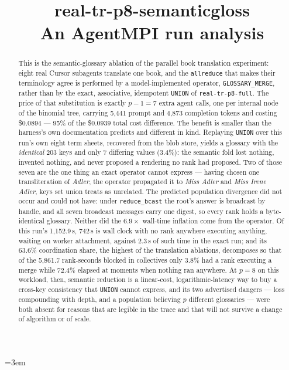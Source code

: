 \documentclass[11pt]{article}
\title{\textbf{real-tr-p8-semanticgloss}\\[2pt]\large An AgentMPI run analysis}
\author{}
\date{}
\begin{document}
\emergencystretch=3em
\maketitle

\begin{abstract}
This is the semantic-glossary ablation of the parallel book translation experiment: eight real
Cursor subagents translate one book, and the \texttt{allreduce} that makes their terminology
agree is performed by a model-implemented operator, \texttt{GLOSSARY\_MERGE}, rather than by the
exact, associative, idempotent \texttt{UNION} of \texttt{real-tr-p8-full}. The price of that
substitution is exactly $p-1=7$ extra agent calls, one per internal node of the binomial tree,
carrying 5{,}441 prompt and 4{,}873 completion tokens and costing \$0.0894 --- 95\% of the
\$0.0939 total cost difference. The benefit is smaller than the harness's own documentation
predicts and different in kind. Replaying \texttt{UNION} over this run's own eight term sheets,
recovered from the blob store, yields a glossary with the \emph{identical} 203 keys and only 7
differing values (3.4\%): the semantic fold lost nothing, invented nothing, and never proposed a
rendering no rank had proposed. Two of those seven are the one thing an exact operator cannot
express --- having chosen one transliteration of \emph{Adler}, the operator propagated it to
\emph{Miss Adler} and \emph{Miss Irene Adler}, keys set union treats as unrelated. The predicted
population divergence did not occur and could not have: under \texttt{reduce\_bcast} the root's
answer is broadcast by handle, and all seven broadcast messages carry one digest, so every rank
holds a byte-identical glossary. Neither did the $6.9\times$ wall-time inflation come from the
operator. Of this run's 1{,}152.9\,s, 742\,s is wall clock with no rank anywhere executing
anything, waiting on worker attachment, against 2.3\,s of such time in the exact run; and its
63.6\% coordination share, the highest of the translation ablations, decomposes so that of the
5{,}861.7 rank-seconds blocked in collectives only 3.8\% had a rank executing a merge while
72.4\% elapsed at moments when nothing ran anywhere. At $p=8$ on this workload, then, semantic
reduction is a linear-cost, logarithmic-latency way to buy a cross-key consistency that
\texttt{UNION} cannot express, and its two advertised dangers --- loss compounding with depth,
and a population believing $p$ different glossaries --- were both absent for reasons that are
legible in the trace and that will not survive a change of algorithm or of scale.
\end{abstract}
\end{document}
